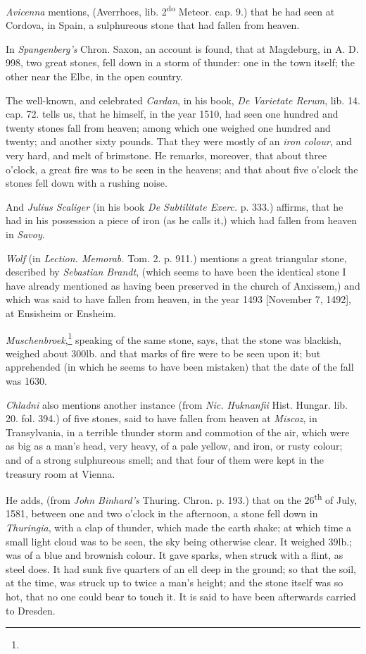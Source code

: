 \documentclass[a4paper, 12pt, oneside, twocolumn]{article}
\begin{document}
\emph{Avicenna} mentions, (Averrhoes, lib. 2\textsuperscript{do} Meteor. cap. 9.) that he had seen at Cordova, in Spain, a sulphureous stone that had fallen from heaven.

In \emph{Spangenberg's} Chron. Saxon, an account is found, that at Magdeburg, in A. D. 998, two great stones, fell down in a storm of thunder: one in the town itself; the other near the Elbe, in the open country.

The well-known, and celebrated \emph{Cardan}, in his book, \emph{De Varietate Rerum}, lib. 14. cap. 72. tells us, that he himself, in the year 1510, had seen one hundred and twenty stones fall from heaven; among which one weighed one hundred and twenty; and another sixty pounds. That they were mostly of an \emph{iron colour}, and very hard, and melt of brimstone. He remarks, moreover, that about three o'clock, a great fire was to be seen in the heavens; and that about five o'clock the stones fell down with a rushing noise.

And \emph{Julius Scaliger} (in his book \emph{De Subtilitate Exerc.} p. 333.) affirms, that he had in his possession a piece of iron (as he calls it,) which had fallen from heaven in \emph{Savoy}.

\emph{Wolf} (in \emph{Lection. Memorab.} Tom. 2. p. 911.) mentions a great triangular stone, described by \emph{Sebastian Brandt}, (which seems to have been the identical stone I have already mentioned as having been preserved in the church of Anxissem,) and which was said to have fallen from heaven, in the year 1493 [November 7, 1492], at Ensisheim or Ensheim.

\emph{Muschenbroek},\footnote{} speaking of the same stone, says, that the stone was blackish, weighed about 300lb. and that marks of fire were to be seen upon it; but apprehended (in which he seems to have been mistaken) that the date of the fall was 1630.

\emph{Chladni} also mentions another instance (from \emph{Nic. Huknanfii} Hist. Hungar. lib. 20. fol. 394.) of five stones, said to have fallen from heaven at \emph{Miscoz}, in Transylvania, in a terrible thunder storm and commotion of the air, which were as big as a man's head, very heavy, of a pale yellow, and iron, or rusty colour; and of a strong sulphureous smell; and that four of them were kept in the treasury room at Vienna.

He adds, (from \emph{John Binhard's} Thuring. Chron. p. 193.) that on the 26\textsuperscript{th} of July, 1581, between one and two o'clock in the afternoon, a stone fell down in \emph{Thuringia}, with a clap of thunder, which made the earth shake; at which time a small light cloud was to be seen, the sky being otherwise clear. It weighed 39lb.; was of a blue and brownish colour. It gave sparks, when struck with a flint, as steel does. It had sunk five quarters of an ell deep in the ground; so that the soil, at the time, was struck up to twice a man's height; and the stone itself was so hot, that no one could bear to touch it. It is said to have been afterwards carried to Dresden.
\end{document}
